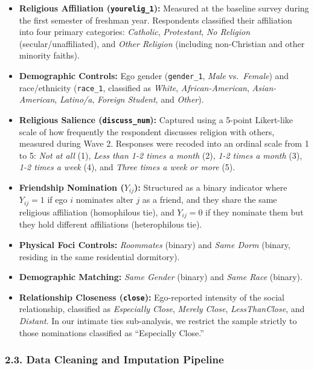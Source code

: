 \documentclass[
  letterpaper,
  DIV=11,
  numbers=noendperiod]{scrartcl}
\providecommand{\tightlist}{%
  \setlength{\itemsep}{0pt}\setlength{\parskip}{0pt}}
\begin{document}
\begin{itemize}
\tightlist
\item
  \textbf{Religious Affiliation (\texttt{yourelig\_1}):} Measured at the
  baseline survey during the first semester of freshman year.
  Respondents classified their affiliation into four primary categories:
  \emph{Catholic}, \emph{Protestant}, \emph{No Religion}
  (secular/unaffiliated), and \emph{Other Religion} (including
  non-Christian and other minority faiths).
\item
  \textbf{Demographic Controls:} Ego gender (\texttt{gender\_1},
  \emph{Male} vs.~\emph{Female}) and race/ethnicity (\texttt{race\_1},
  classified as \emph{White}, \emph{African-American},
  \emph{Asian-American}, \emph{Latino/a}, \emph{Foreign Student}, and
  \emph{Other}).
\item
  \textbf{Religious Salience (\texttt{discuss\_num}):} Captured using a
  5-point Likert-like scale of how frequently the respondent discusses
  religion with others, measured during Wave 2. Responses were recoded
  into an ordinal scale from 1 to 5: \emph{Not at all} (1), \emph{Less
  than 1-2 times a month} (2), \emph{1-2 times a month} (3), \emph{1-2
  times a week} (4), and \emph{Three times a week or more} (5).
\item
  \textbf{Friendship Nomination (\(Y_{ij}\)):} Structured as a binary
  indicator where \(Y_{ij} = 1\) if ego \(i\) nominates alter \(j\) as a
  friend, and they share the same religious affiliation (homophilous
  tie), and \(Y_{ij} = 0\) if they nominate them but they hold different
  affiliations (heterophilous tie).
\item
  \textbf{Physical Foci Controls:} \emph{Roommates} (binary) and
  \emph{Same Dorm} (binary, residing in the same residential dormitory).
\item
  \textbf{Demographic Matching:} \emph{Same Gender} (binary) and
  \emph{Same Race} (binary).
\item
  \textbf{Relationship Closeness (\texttt{close}):} Ego-reported
  intensity of the social relationship, classified as \emph{Especially
  Close}, \emph{Merely Close}, \emph{LessThanClose}, and \emph{Distant}.
  In our intimate ties sub-analysis, we restrict the sample strictly to
  those nominations classified as ``Especially Close.''
\end{itemize}

\subsubsection{2.3. Data Cleaning and Imputation
Pipeline}\label{data-cleaning-and-imputation-pipeline}
\end{document}
